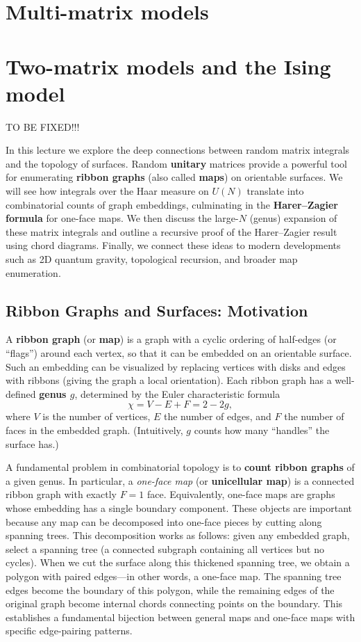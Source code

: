 \documentclass[letterpaper,11pt,oneside,reqno]{article}
\numberwithin{equation}{section}
\theoremstyle{definition}
\begin{document}
\section{Multi-matrix models}



\section{Two-matrix models and the Ising model}



TO BE FIXED!!!


In this lecture we explore the deep connections between random matrix integrals and the topology of surfaces. Random \textbf{unitary} matrices provide a powerful tool for enumerating \textbf{ribbon graphs} (also called \textbf{maps}) on orientable surfaces. We will see how integrals over the Haar measure on $U(N)$ translate into combinatorial counts of graph embeddings, culminating in the \textbf{Harer–Zagier formula} for one-face maps. We then discuss the large-$N$ (genus) expansion of these matrix integrals and outline a recursive proof of the Harer–Zagier result using chord diagrams. Finally, we connect these ideas to modern developments such as 2D quantum gravity, topological recursion, and broader map enumeration.

\subsection*{Ribbon Graphs and Surfaces: Motivation}

A \textbf{ribbon graph} (or \textbf{map}) is a graph with a cyclic ordering of half-edges (or ``flags'') around each vertex, so that it can be embedded on an orientable surface. Such an embedding can be visualized by replacing vertices with disks and edges with ribbons (giving the graph a local orientation). Each ribbon graph has a well-defined \textbf{genus $g$}, determined by the Euler characteristic formula
\[ \chi = V - E + F = 2 - 2g, \]
where $V$ is the number of vertices, $E$ the number of edges, and $F$ the number of faces in the embedded graph. (Intuitively, $g$ counts how many ``handles'' the surface has.)

A fundamental problem in combinatorial topology is to \textbf{count ribbon graphs} of a given genus. In particular, a \emph{one-face map} (or \textbf{unicellular map}) is a connected ribbon graph with exactly $F=1$ face. Equivalently, one-face maps are graphs whose embedding has a single boundary component. These objects are important because any map can be decomposed into one-face pieces by cutting along spanning trees. This decomposition works as follows: given any embedded graph, select a spanning tree (a connected subgraph containing all vertices but no cycles). When we cut the surface along this thickened spanning tree, we obtain a polygon with paired edges—in other words, a one-face map. The spanning tree edges become the boundary of this polygon, while the remaining edges of the original graph become internal chords connecting points on the boundary. This establishes a fundamental bijection between general maps and one-face maps with specific edge-pairing patterns.
\end{document}
